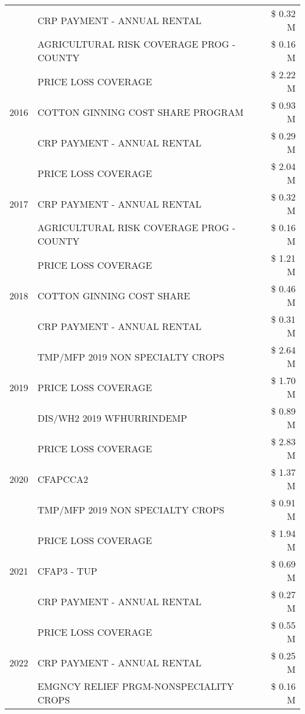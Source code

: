 \begin{tabular}{llr}
 & CRP PAYMENT - ANNUAL RENTAL & \$ 0.32 M \\
 & AGRICULTURAL RISK COVERAGE PROG - COUNTY & \$ 0.16 M \\
\cline{1-3}
\multirow[t]{3}{*}{2016} & PRICE LOSS COVERAGE & \$ 2.22 M \\
 & COTTON GINNING COST SHARE PROGRAM & \$ 0.93 M \\
 & CRP PAYMENT - ANNUAL RENTAL & \$ 0.29 M \\
\cline{1-3}
\multirow[t]{3}{*}{2017} & PRICE LOSS COVERAGE & \$ 2.04 M \\
 & CRP PAYMENT - ANNUAL RENTAL & \$ 0.32 M \\
 & AGRICULTURAL RISK COVERAGE PROG - COUNTY & \$ 0.16 M \\
\cline{1-3}
\multirow[t]{3}{*}{2018} & PRICE LOSS COVERAGE & \$ 1.21 M \\
 & COTTON GINNING COST SHARE & \$ 0.46 M \\
 & CRP PAYMENT - ANNUAL RENTAL & \$ 0.31 M \\
\cline{1-3}
\multirow[t]{3}{*}{2019} & TMP/MFP 2019 NON SPECIALTY CROPS & \$ 2.64 M \\
 & PRICE LOSS COVERAGE & \$ 1.70 M \\
 & DIS/WH2 2019 WFHURRINDEMP & \$ 0.89 M \\
\cline{1-3}
\multirow[t]{3}{*}{2020} & PRICE LOSS COVERAGE & \$ 2.83 M \\
 & CFAPCCA2 & \$ 1.37 M \\
 & TMP/MFP 2019 NON SPECIALTY CROPS & \$ 0.91 M \\
\cline{1-3}
\multirow[t]{3}{*}{2021} & PRICE LOSS COVERAGE & \$ 1.94 M \\
 & CFAP3 - TUP & \$ 0.69 M \\
 & CRP PAYMENT - ANNUAL RENTAL & \$ 0.27 M \\
\cline{1-3}
\multirow[t]{3}{*}{2022} & PRICE LOSS COVERAGE & \$ 0.55 M \\
 & CRP PAYMENT - ANNUAL RENTAL & \$ 0.25 M \\
 & EMGNCY RELIEF PRGM-NONSPECIALITY CROPS & \$ 0.16 M \\
\cline{1-3}
\bottomrule
\end{tabular}
